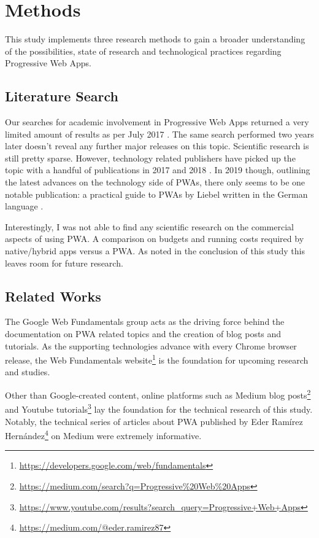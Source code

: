 \chapter{Methods}

This study implements three research methods to gain a broader understanding of the possibilities, state of research and technological practices regarding Progressive Web Apps.

\section{Literature Search}

Our searches for academic involvement in Progressive Web Apps returned a very limited amount of results as per July 2017 \citep{biorn-hansenProgressiveWebApps2018}. The same search performed two years later doesn't reveal any further major releases on this topic. Scientific research is still pretty sparse. However, technology related publishers have picked up the topic with a handful of publications in 2017 and 2018 \citep{humeProgressiveWebApps2018,aterBuildingProgressiveWeb2017}. In 2019 though, outlining the latest advances on the technology side of PWAs, there only seems to be one notable publication: a practical guide to PWAs by Liebel written in the German language \citep{liebelProgressiveWebApps2019}.

Interestingly, I was not able to find any scientific research on the commercial aspects of using PWA. A comparison on budgets and running costs required by native/hybrid apps versus a PWA. As noted in the conclusion of this study this leaves room for future research.

\section{Related Works}
The Google Web Fundamentals group acts as the driving force behind the documentation on PWA related topics and the creation of blog posts and tutorials. As the supporting technologies advance with every Chrome browser release, the Web Fundamentals website\footnote{\url{https://developers.google.com/web/fundamentals}} is the foundation for upcoming research and studies.

Other than Google-created content, online platforms such as Medium blog posts\footnote{\url{https://medium.com/search?q=Progressive\%20Web\%20Apps}} and Youtube tutorials\footnote{\url{https://www.youtube.com/results?search_query=Progressive+Web+Apps}} lay the foundation for the technical research of this study. Notably, the technical series of articles about PWA published by Eder Ramírez Hernández\footnote{\url{https://medium.com/@eder.ramirez87}} on Medium were extremely informative.

